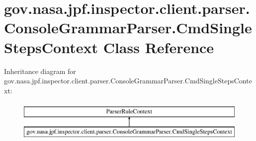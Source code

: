 \hypertarget{classgov_1_1nasa_1_1jpf_1_1inspector_1_1client_1_1parser_1_1_console_grammar_parser_1_1_cmd_single_steps_context}{}\section{gov.\+nasa.\+jpf.\+inspector.\+client.\+parser.\+Console\+Grammar\+Parser.\+Cmd\+Single\+Steps\+Context Class Reference}
\label{classgov_1_1nasa_1_1jpf_1_1inspector_1_1client_1_1parser_1_1_console_grammar_parser_1_1_cmd_single_steps_context}
Inheritance diagram for gov.\+nasa.\+jpf.\+inspector.\+client.\+parser.\+Console\+Grammar\+Parser.\+Cmd\+Single\+Steps\+Context\+:\begin{figure}[H]
\begin{center}
\leavevmode
\includegraphics[height=2.000000cm]{classgov_1_1nasa_1_1jpf_1_1inspector_1_1client_1_1parser_1_1_console_grammar_parser_1_1_cmd_single_steps_context}
\end{center}
\end{figure}
